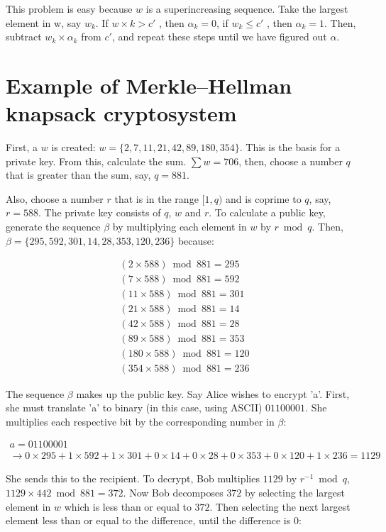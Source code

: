 This problem is easy because $w$ is a superincreasing sequence. Take the largest element in w, say $w_{k}$. If $w \times k > c'$ , then $\alpha_{k} = 0$, if $w_{k} \le c'$ , then $\alpha_{k} = 1$. Then, subtract $w_{k} \times \alpha_{k}$ from $c'$, and repeat these steps until we have figured out $\alpha$.



\section*{Example of Merkle–Hellman knapsack cryptosystem}
First, a $w$ is created: $w = \{2, 7, 11, 21, 42, 89, 180, 354\}$. This is the basis for a private key. From this, calculate the sum. $\sum w=706$, then, choose a number $q$ that is greater than the sum, say, $q = 881$.

Also, choose a number $r$ that is in the range $[1,q)$ and is coprime to $q$, say, $r = 588$. The private key consists of $q$, $w$ and $r$. To calculate a public key, generate the sequence $\beta$ by multiplying each element in $w$ by $r \bmod q$. Then, $\beta = \{295, 592, 301, 14, 28, 353, 120, 236\}$ because:

\[
\begin{split}
(2 \times 588) \bmod 881 = 295\\
(7 \times 588) \bmod 881 = 592\\
(11 \times 588) \bmod 881 = 301\\
(21 \times 588) \bmod 881 = 14\\
(42 \times 588) \bmod 881 = 28\\
(89 \times 588) \bmod 881 = 353\\
(180 \times 588) \bmod 881 = 120\\
(354 \times 588) \bmod 881 = 236
\end{split}
\]

The sequence $\beta$ makes up the public key. Say Alice wishes to encrypt 'a'. First, she must translate 'a' to binary (in this case, using ASCII) $\text{01100001}$. She multiplies each respective bit by the corresponding number in $\beta$:

\begin{gather*}
a = 01100001 \\ \to   
0 \times 295
+ 1 \times 592
+ 1 \times 301
+ 0 \times 14
+ 0 \times 28
+ 0 \times 353
+ 0 \times 120
+ 1 \times 236  
= 1129
\end{gather*}


She sends this to the recipient. To decrypt, Bob multiplies $1129$ by $r^{-1} \bmod q$, $1129 \times 442 \bmod 881 = 372$. Now Bob decomposes $372$ by selecting the largest element in $w$ which is less than or equal to $372$. Then selecting the next largest element less than or equal to the difference, until the difference is $0$:


